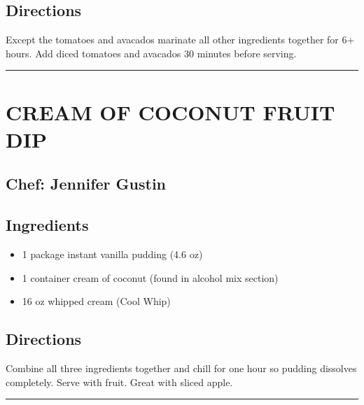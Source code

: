 \documentclass[
]{book}
\providecommand{\tightlist}{%
  \setlength{\itemsep}{0pt}\setlength{\parskip}{0pt}}
\begin{document}
\hypertarget{directions-1}{%
\subsection*{Directions}\label{directions-1}}


Except the tomatoes and avacados marinate all other ingredients together for 6+ hours.
Add diced tomatoes and avacados 30 minutes before serving.

\begin{center}\rule{0.5\linewidth}{0.5pt}\end{center}

\hypertarget{cream-of-coconut-fruit-dip}{%
\section*{CREAM OF COCONUT FRUIT DIP}\label{cream-of-coconut-fruit-dip}}


\hypertarget{chef-jennifer-gustin}{%
\subsection*{Chef: Jennifer Gustin}\label{chef-jennifer-gustin}}


\hypertarget{ingredients-2}{%
\subsection*{Ingredients}\label{ingredients-2}}


\begin{itemize}
\tightlist
\item
  1 package instant vanilla pudding (4.6 oz)
\item
  1 container cream of coconut (found in alcohol mix section)
\item
  16 oz whipped cream (Cool Whip)
\end{itemize}

\hypertarget{directions-2}{%
\subsection*{Directions}\label{directions-2}}


Combine all three ingredients together and chill for one hour so pudding dissolves completely.
Serve with fruit. Great with sliced apple.

\begin{center}\rule{0.5\linewidth}{0.5pt}\end{center}
\end{document}
